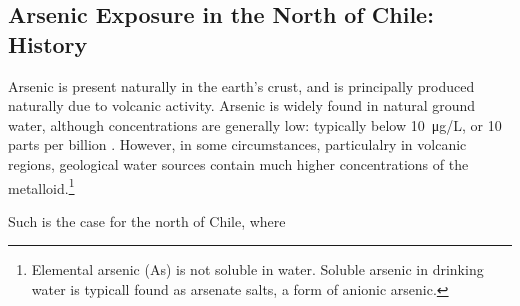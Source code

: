 \documentclass{article}[12pt,subeqn]
\begin{document}
\begin{spacing}{1.4}
\section{Arsenic Exposure in the North of Chile: History}
Arsenic is present naturally in the earth's crust, and is principally
produced naturally due to volcanic activity.  Arsenic is widely found
in natural ground water, although concentrations are generally low:
typically below \SI{10}{\micro\gram}/L, or 10
parts per billion \citep{WHO2001}.  However, in some circumstances,
particulalry in volcanic regions, geological water sources contain
much higher concentrations of the metalloid.\footnote{Elemental arsenic
(As) is not soluble in water.  Soluble arsenic in drinking water is
typicall found as arsenate salts, a form of anionic arsenic.}

Such is the case for the north of Chile, where 




\newpage


\end{spacing}
\end{document}
